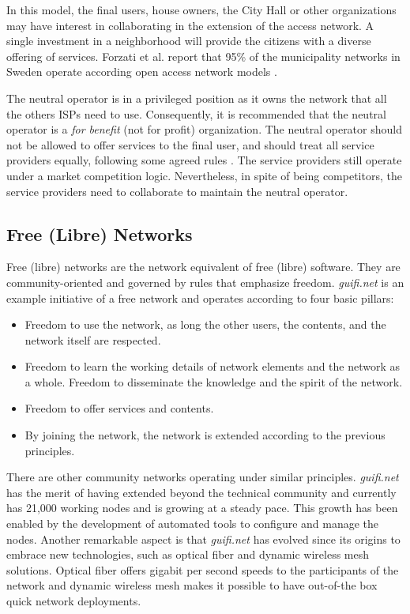 \documentclass[journal]{IEEEtran}
\begin{document}
In this model, the final users, house owners, the City Hall or other organizations may have interest in collaborating in the extension of the access network.
A single investment in a neighborhood will provide the citizens with a diverse offering of services.
Forzati et al. report that 95\% of the municipality networks in Sweden operate according open access network models \cite{forzati2010open}.

The neutral operator is in a privileged position as it owns the network that all the others ISPs need to use.
Consequently, it is recommended that the neutral operator is a \emph{for benefit} (not for profit) organization.
The neutral operator should not be allowed to offer services to the final user, and should treat all service providers equally, following some agreed rules \cite{battiti2005wireless}.
The service providers still operate under a market competition logic.
Nevertheless, in spite of being competitors, the service providers need to collaborate to maintain the neutral operator.

\subsection{Free (Libre) Networks}

Free (libre) networks are the network equivalent of free (libre) software.
They are community-oriented and governed by rules that emphasize freedom.
\emph{guifi.net} is an example initiative of a free network and operates according to four basic pillars:
\begin{itemize}
\item Freedom to use the network, as long the other users, the contents, and the network itself are respected.
\item Freedom to learn the working details of network elements and the network as a whole. Freedom to disseminate the knowledge and the spirit of the network.
\item Freedom to offer services and contents.
\item By joining the network, the network is extended according to the previous principles.
\end{itemize}

There are other community networks operating under similar principles.
\emph{guifi.net} has the merit of having extended beyond the technical community and currently has 21,000 working nodes and is growing at a steady pace.
This growth has been enabled by the development of automated tools to configure and manage the nodes.
Another remarkable aspect is that \emph{guifi.net} has evolved since its origins to embrace new technologies, such as optical fiber and dynamic wireless mesh solutions.
Optical fiber offers gigabit per second speeds to the participants of the network and dynamic wireless mesh makes it possible to have out-of-the box quick network deployments.
\end{document}
